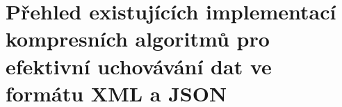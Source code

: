 \chapter{Přehled existujících implementací kompresních algoritmů pro efektivní uchovávání dat ve formátu XML a JSON}
\label{kapitolaSpecifickeAlgoritmy}